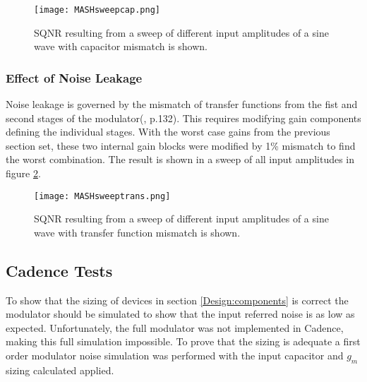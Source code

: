         \begin{figure}
            \begin{center}
            \texttt{[image: MASHsweepcap.png]}
            \label{fig:SQNRcap}
            \caption{SQNR resulting from a sweep of different input amplitudes of a sine wave with capacitor mismatch is shown.}
            \end{center}
        \end{figure} 

        \subsubsection{Effect of Noise Leakage} 
        Noise leakage is governed by the mismatch of transfer functions from the fist and second stages of the modulator(\cite{Schreier2004}, p.132).
        This requires modifying gain components defining the individual stages.
        With the worst case gains from the previous section set, these two internal gain blocks were modified by 1\% mismatch to find the worst combination.
        The result is shown in a sweep of all input amplitudes in figure \ref{fig:SQNRtrans}.

        \begin{figure}
            \begin{center}
            \texttt{[image: MASHsweeptrans.png]}
            \label{fig:SQNRtrans}
            \caption{SQNR resulting from a sweep of different input amplitudes of a sine wave with transfer function mismatch is shown.}
            \end{center}
        \end{figure} 

    \subsection{Cadence Tests}
    To show that the sizing of devices in section \ref{Design:components} is correct the modulator should be simulated to show that the input referred noise is as low as expected.
    Unfortunately, the full modulator was not implemented in Cadence, making this full simulation impossible.
    To prove that the sizing is adequate a first order modulator noise simulation was performed with the input capacitor and $g_{m}$ sizing calculated applied.

